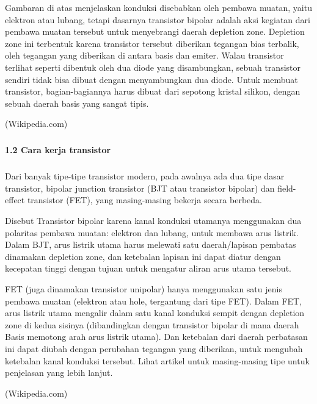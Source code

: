 \documentclass[12pt,a4paper]{article}
\begin{document}
Gambaran di atas menjelaskan konduksi disebabkan oleh pembawa muatan, yaitu elektron atau lubang, tetapi dasarnya transistor bipolar adalah aksi kegiatan dari pembawa muatan tersebut untuk menyebrangi daerah depletion zone. Depletion zone ini terbentuk karena transistor tersebut diberikan tegangan bias terbalik, oleh tegangan yang diberikan di antara basis dan emiter. Walau transistor terlihat seperti dibentuk oleh dua diode yang disambungkan, sebuah transistor sendiri tidak bisa dibuat dengan menyambungkan dua diode. Untuk membuat transistor, bagian-bagiannya harus dibuat dari sepotong kristal silikon, dengan sebuah daerah basis yang sangat tipis.

\begin{flushright}
(Wikipedia.com)
\end{flushright}

\subparagraph{ }
\textbf{1.2 Cara kerja transistor}
\subparagraph{ }
 Dari banyak tipe-tipe transistor modern, pada awalnya ada dua tipe dasar transistor, bipolar junction transistor (BJT atau transistor bipolar) dan field-effect transistor (FET), yang masing-masing bekerja secara berbeda.

Disebut Transistor bipolar karena kanal konduksi utamanya menggunakan dua polaritas pembawa muatan: elektron dan lubang, untuk membawa arus listrik. Dalam BJT, arus listrik utama harus melewati satu daerah/lapisan pembatas dinamakan depletion zone, dan ketebalan lapisan ini dapat diatur dengan kecepatan tinggi dengan tujuan untuk mengatur aliran arus utama tersebut.

FET (juga dinamakan transistor unipolar) hanya menggunakan satu jenis pembawa muatan (elektron atau hole, tergantung dari tipe FET). Dalam FET, arus listrik utama mengalir dalam satu kanal konduksi sempit dengan depletion zone di kedua sisinya (dibandingkan dengan transistor bipolar di mana daerah Basis memotong arah arus listrik utama). Dan ketebalan dari daerah perbatasan ini dapat diubah dengan perubahan tegangan yang diberikan, untuk mengubah ketebalan kanal konduksi tersebut. Lihat artikel untuk masing-masing tipe untuk penjelasan yang lebih lanjut.

\begin{flushright}
(Wikipedia.com) 
\end{flushright}
\end{document}
